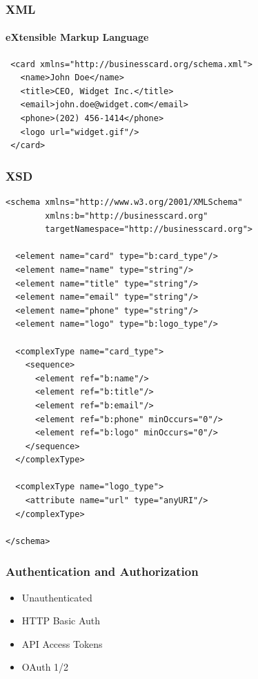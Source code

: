 \documentclass[dvipsnames]{beamer}
\begin{document}
\begin{frame}[fragile=singleslide]
	\frametitle{XML}
	\framesubtitle{eXtensible Markup Language}
	\begin{Verbatim}
 <card xmlns="http://businesscard.org/schema.xml">
   <name>John Doe</name>
   <title>CEO, Widget Inc.</title>
   <email>john.doe@widget.com</email>
   <phone>(202) 456-1414</phone>
   <logo url="widget.gif"/>
 </card>
	\end{Verbatim}
\end{frame}


\begin{frame}[fragile=singleslide]
  \frametitle{XSD}
  {\tiny
  \begin{Verbatim}
<schema xmlns="http://www.w3.org/2001/XMLSchema"
        xmlns:b="http://businesscard.org"
        targetNamespace="http://businesscard.org">

  <element name="card" type="b:card_type"/>
  <element name="name" type="string"/>
  <element name="title" type="string"/>
  <element name="email" type="string"/>
  <element name="phone" type="string"/>
  <element name="logo" type="b:logo_type"/>

  <complexType name="card_type">
    <sequence>
      <element ref="b:name"/>
      <element ref="b:title"/>
      <element ref="b:email"/>
      <element ref="b:phone" minOccurs="0"/>
      <element ref="b:logo" minOccurs="0"/>
    </sequence>
  </complexType>

  <complexType name="logo_type">
    <attribute name="url" type="anyURI"/>
  </complexType>

</schema>
  \end{Verbatim}
}
\end{frame}


\begin{frame}
  \frametitle{Authentication and Authorization}
  \begin{itemize}
    \item Unauthenticated
    \item HTTP Basic Auth
    \item API Access Tokens
    \item OAuth 1/2
  \end{itemize}
\end{frame}
\end{document}
